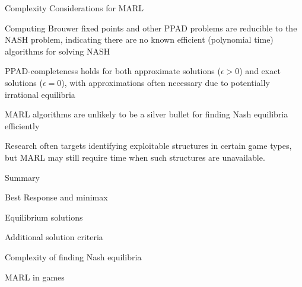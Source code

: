 \begin{frame}{Complexity Considerations for MARL}

\blist
    \item {} Computing Brouwer fixed points and other PPAD problems are reducible to the NASH problem, indicating there are no known efficient (polynomial time) algorithms for solving NASH
    
    \item {} PPAD-completeness holds for both approximate solutions (\(\epsilon > 0\)) and exact solutions (\(\epsilon = 0\)), with approximations often necessary due to potentially irrational equilibria
    
    \item {} MARL algorithms are unlikely to be a silver bullet for finding Nash equilibria efficiently
    
    \item {} Research often targets identifying exploitable structures in certain game types, but MARL may still require  time when such structures are unavailable.
\elist
    
\end{frame}

\begin{frame}{Summary}

    \blist
        \item Best Response and minimax
        \item Equilibrium solutions
        \item Additional solution criteria
        \item Complexity of finding Nash equilibria
    \elist


    \blist
        \item MARL in games
    \elist
    
\end{frame}




